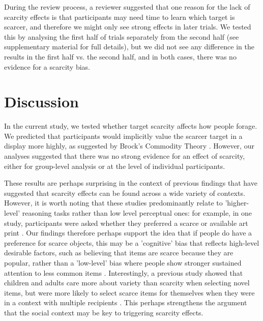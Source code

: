\documentclass[12pt]{article}
\begin{document}
During the review process, a reviewer suggested that one reason for the lack of scarcity effects is that participants may need time to learn which target is scarcer, and therefore we might only see strong effects in later trials. We tested this by analysing the first half of trials separately from the second half (see supplementary material for full details), but we did not see any difference in the results in the first half vs. the second half, and in both cases, there was no evidence for a scarcity bias. 

\section{Discussion}

In the current study, we tested whether target scarcity affects how people forage. We predicted that participants would implicitly value the scarcer target in a display more highly, as suggested by Brock's Commodity Theory \citep{brock1968implications}. However, our analyses suggested that there was no strong evidence for an effect of scarcity, either for group-level analysis or at the level of individual participants.

These results are perhaps surprising in the context of previous findings \citep{brock1992liberalization, lynn1991scarcity} that have suggested that scarcity effects can be found across a wide variety of contexts. However, it is worth noting that these studies predominantly relate to 'higher-level' reasoning tasks rather than low level perceptual ones: for example, in one study, participants were asked whether they preferred a scarce or available art print \citep{lynn1989scarcity}. Our findings therefore perhaps support the idea that if people do have a preference for scarce objects, this may be a 'cognitive' bias that reflects high-level desirable factors, such as believing that items are scarce because they are popular, rather than a 'low-level' bias where people show stronger sustained attention to less common items \citep{sehnert2014scarcity}. Interestingly, a previous study showed that children and adults care more about variety than scarcity when selecting novel items, but were more likely to select scarce items for themselves when they were in a context with multiple recipients \citep{echelbarger2017value}. This perhaps strengthens the argument that the social context may be key to triggering scarcity effects.
\end{document}
